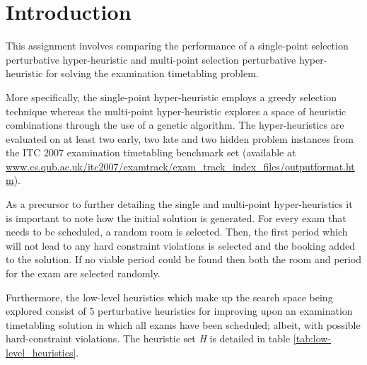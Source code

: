 \section{Introduction}\label{sec:introduction}
This assignment involves comparing the performance of a single-point selection perturbative hyper-heuristic and multi-point selection perturbative hyper-heuristic for solving the examination timetabling problem. 

More specifically, the single-point hyper-heuristic employs a greedy selection technique whereas the multi-point hyper-heuristic explores a space of heuristic combinations through the use of a genetic algorithm. The hyper-heuristics are evaluated on at least two early, two late and
two hidden problem instances from the ITC 2007 examination timetabling
benchmark set \cite{mccollum2010setting} (available at \url{www.cs.qub.ac.uk/itc2007/examtrack/exam_track_index_files/outputformat.htm}).

As a precursor to further detailing the single and multi-point hyper-heuristics it is important to note how the initial solution is generated. For every exam that needs to be scheduled, a random room is selected. Then, the first period which will not lead to any hard constraint violations is selected and the booking added to the solution. If no viable period could be found then both the room and period for the exam are selected randomly.

Furthermore, the low-level heuristics which make up the search space being explored consist of 5 perturbative heuristics for improving upon an examination timetabling solution in which all exams have been scheduled; albeit, with possible hard-constraint violations. The heuristic set \emph{H} is detailed in table \ref{tab:low-level_heuristics}.


